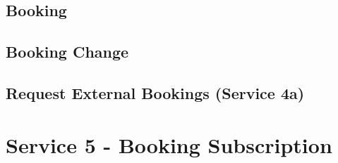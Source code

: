 \subsection*{Booking}
\label{subsec:Nachrichten:Dienst4:Booking}



\medskip




\subsection*{Booking Change}
\label{subsec:Nachrichten:Dienst4:ChangeBooking}






\subsection*{Request External Bookings (Service 4a)}
\label{subsec:Nachrichten:Dienst4:externalBookingRequestType}





% 

% 







\section{Service 5 - Booking Subscription}
\label{sec:Nachrichten:Dienst5}

